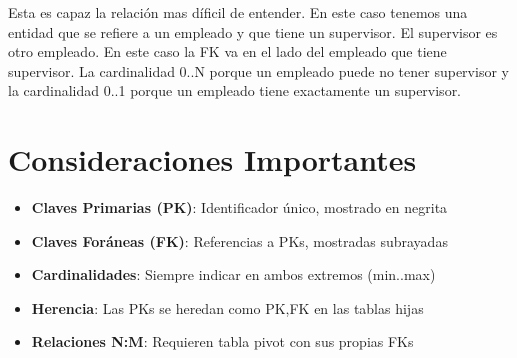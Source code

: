 \documentclass[12pt]{article}
\begin{document}
\begin{center}
\end{center}

Esta es capaz la relación mas díficil de entender. En este caso tenemos una entidad que se refiere a un empleado y que tiene un supervisor. El supervisor es otro empleado. En este caso la FK va en el lado del empleado que tiene supervisor. La cardinalidad 0..N porque un empleado puede no tener supervisor y la cardinalidad 0..1 porque un empleado tiene exactamente un supervisor.

\section{Consideraciones Importantes}
\begin{itemize}
    \item \textbf{Claves Primarias (PK)}: Identificador único, mostrado en negrita
    \item \textbf{Claves Foráneas (FK)}: Referencias a PKs, mostradas subrayadas
    \item \textbf{Cardinalidades}: Siempre indicar en ambos extremos (min..max)
    \item \textbf{Herencia}: Las PKs se heredan como PK,FK en las tablas hijas
    \item \textbf{Relaciones N:M}: Requieren tabla pivot con sus propias FKs
\end{itemize}
\end{document}
